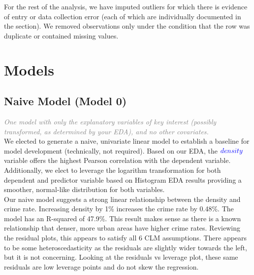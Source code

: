 For the rest of the analysis, we have imputed outliers for which there is evidence of entry or data collection error (each of which are individually documented in the  section). We removed observations only under the condition that the row was duplicate or contained missing values.

\pagebreak
\section{Models}

\subsection{Naive Model (Model 0)}

\textit{\textcolor{Grey}{One model with only the explanatory variables of key interest (possibly transformed, as determined by your EDA), and no other covariates.}}\\

We elected to generate a naive, univariate linear model to establish a baseline for model development (technically, not required).  Based on our EDA, the $\textcolor{Blue}{density}$ variable offers the highest Pearson correlation with the dependent variable.  Additionally, we elect to leverage the logarithm transformation for both dependent and predictor variable based on Histogram EDA results providing a smoother, normal-like distribution for both variables.\\

Our naive model suggests a strong linear relationship between the density and crime rate. Increasing density by 1\% increases the crime rate by 0.48\%. The model has an R-squared of 47.9\%. This result makes sense as there is a known relationship that denser, more urban areas have higher crime rates. Reviewing the residual plots, this appears to satisfy all 6 CLM assumptions. There appears to be some heteroscedasticity as the residuals are slightly wider towards the left, but it is not concerning. Looking at the residuals vs leverage plot, these same residuals are low leverage points and do not skew the regression.

